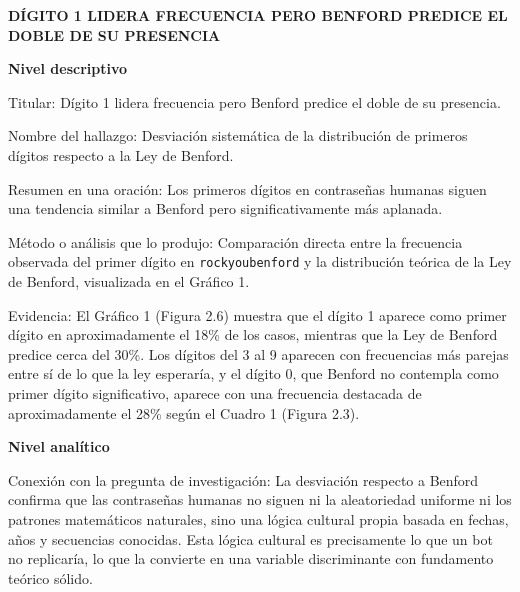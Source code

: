 \documentclass[12pt, letterpaper]{article}
\begin{document}
\begin{center}
    \vspace{0.8cm}
    {\Large \bfseries DÍGITO 1 LIDERA FRECUENCIA PERO BENFORD PREDICE EL DOBLE DE SU PRESENCIA} \\
    \vspace{0.4cm}
\end{center}

\vspace{1.5cm}

\noindent
\textbf{Nivel descriptivo} \newline

\noindent
Titular: Dígito 1 lidera frecuencia pero Benford predice el doble de su presencia. \newline

\noindent
Nombre del hallazgo: Desviación sistemática de la distribución de primeros dígitos respecto a la Ley de Benford. \newline

\noindent
Resumen en una oración: Los primeros dígitos en contraseñas humanas siguen una tendencia similar a Benford pero significativamente más aplanada. \newline

\noindent
Método o análisis que lo produjo: Comparación directa entre la frecuencia observada del primer dígito en \texttt{rockyoubenford} y la distribución teórica de la Ley de Benford, visualizada en el Gráfico 1. \newline

\noindent
Evidencia: El Gráfico 1 (Figura 2.6) muestra que el dígito 1 aparece como primer dígito en aproximadamente el 18\% de los casos, mientras que la Ley de Benford predice cerca del 30\%. Los dígitos del 3 al 9 aparecen con frecuencias más parejas entre sí de lo que la ley esperaría, y el dígito 0, que Benford no contempla como primer dígito significativo, aparece con una frecuencia destacada de aproximadamente el 28\% según el Cuadro 1 (Figura 2.3).
\newpage

\noindent
\textbf{Nivel analítico} \newline

\noindent
Conexión con la pregunta de investigación: La desviación respecto a Benford confirma que las contraseñas humanas no siguen ni la aleatoriedad uniforme ni los patrones matemáticos naturales, sino una lógica cultural propia basada en fechas, años y secuencias conocidas. Esta lógica cultural es precisamente lo que un bot no replicaría, lo que la convierte en una variable discriminante con fundamento teórico sólido. \newline
\end{document}
